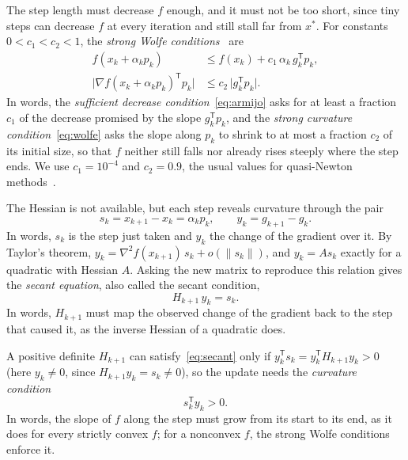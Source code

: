 \documentclass[11pt,a4paper]{amsart}
\numberwithin{equation}{section}
\theoremstyle{plain}
\theoremstyle{definition}
\theoremstyle{remark}
\newcommand{\grad}{\nabla}
\newcommand{\T}{\mathsf{T}}
\newcommand{\norm}[1]{\lVert #1 \rVert}
\begin{document}
The step length must decrease $f$ enough, and it must not be too short,
since tiny steps can decrease $f$ at every iteration and still stall far
from $x^*$. For constants $0 < c_1 < c_2 < 1$, the \emph{strong Wolfe
conditions}~\cite[(3.7)]{nocedal2006} are
\begin{align}
  f(x_k + \alpha_k p_k) &\leq f(x_k) + c_1\, \alpha_k\, g_k^\T p_k,
    \label{eq:armijo}\\
  \bigl\lvert \grad f(x_k + \alpha_k p_k)^\T p_k \bigr\rvert
    &\leq c_2\, \bigl\lvert g_k^\T p_k \bigr\rvert .
    \label{eq:wolfe}
\end{align}
In words, the \emph{sufficient decrease condition}~\eqref{eq:armijo}
asks for at least a fraction $c_1$ of the decrease promised by the slope
$g_k^\T p_k$, and the \emph{strong curvature condition}~\eqref{eq:wolfe}
asks the slope along $p_k$ to shrink to at most a fraction $c_2$ of its
initial size, so that $f$ neither still falls nor already rises steeply
where the step ends. We use $c_1 = 10^{-4}$ and $c_2 = 0.9$, the usual
values for quasi-Newton methods~\cite[Ch.~3]{nocedal2006}.

The Hessian is not available, but each step reveals curvature through
the pair
\begin{equation}\label{eq:sy}
  s_k = x_{k+1} - x_k = \alpha_k p_k, \qquad y_k = g_{k+1} - g_k .
\end{equation}
In words, $s_k$ is the step just taken and $y_k$ the change of the
gradient over it. By Taylor's theorem,
$y_k = \grad^2 f(x_{k+1})\, s_k + o(\norm{s_k})$, and $y_k = A s_k$
exactly for a quadratic with Hessian $A$. Asking the new matrix to
reproduce this relation gives the \emph{secant equation}, also called
the secant condition,
\begin{equation}\label{eq:secant}
  H_{k+1}\, y_k = s_k .
\end{equation}
In words, $H_{k+1}$ must map the observed change of the gradient back to
the step that caused it, as the inverse Hessian of a quadratic does.

A positive definite $H_{k+1}$ can satisfy~\eqref{eq:secant} only if
$y_k^\T s_k = y_k^\T H_{k+1} y_k > 0$ (here $y_k \neq 0$, since
$H_{k+1} y_k = s_k \neq 0$), so the update needs the \emph{curvature
condition}
\begin{equation}\label{eq:curvature}
  s_k^\T y_k > 0 .
\end{equation}
In words, the slope of $f$ along the step must grow from its start to
its end, as it does for every strictly convex $f$; for a nonconvex $f$,
the strong Wolfe conditions enforce it.
\end{document}
